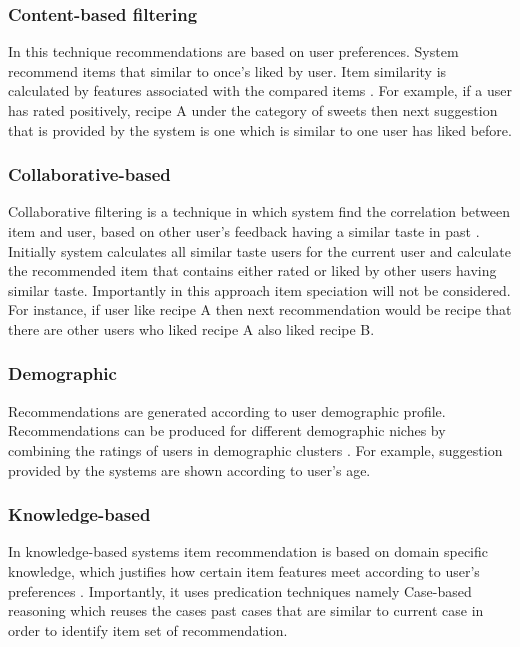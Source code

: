 \subsubsection{Content-based filtering}

In this technique recommendations are based on user preferences. System recommend items that similar to once's liked by user. Item similarity is calculated by features associated with the compared items \cite{ricci2011introduction}. For example, if a user has rated positively, recipe A under the category of sweets then next suggestion that is provided by the system is one which is similar to one user has liked before.

\subsubsection{Collaborative-based}

Collaborative filtering is a technique in which system find the correlation between item and user, based on other user’s feedback having a similar taste in past \cite{ricci2011introduction}. Initially system calculates all similar taste users for the current user and calculate the recommended item that contains either rated or liked by other users having similar taste. Importantly in this approach item speciation will not be considered. For instance, if user like recipe A then next recommendation would be recipe that there are other users who liked recipe A also liked recipe B.

\subsubsection{Demographic}

Recommendations are generated according to user demographic profile. Recommendations can be produced for different demographic niches by combining the ratings of users in demographic clusters \cite{mahmood2007towards}. For example, suggestion provided by the systems are shown according to user’s age. 

\subsubsection{Knowledge-based}

In knowledge-based systems item recommendation is based on domain specific knowledge, which justifies how certain item features meet according to user’s preferences \cite{ricci2011introduction}. Importantly, it uses predication techniques namely Case-based reasoning which reuses the cases past cases that are similar to current case in order to identify item set of recommendation.

